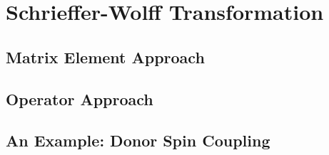 \section{Schrieffer-Wolff Transformation}\label{SEC:sw_trans}

\subsection{Matrix Element Approach}
\subsection{Operator Approach}
\subsection{An Example: Donor Spin Coupling}